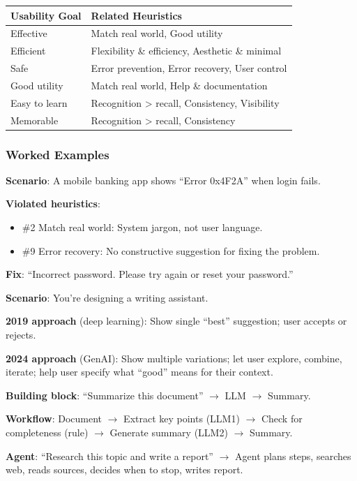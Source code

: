 \begin{center}
\renewcommand{\arraystretch}{1.2}
\begin{tabular}{@{} l l @{}}
\toprule
\textbf{Usability Goal} & \textbf{Related Heuristics} \\
\midrule
Effective & Match real world, Good utility \\
Efficient & Flexibility \& efficiency, Aesthetic \& minimal \\
Safe & Error prevention, Error recovery, User control \\
Good utility & Match real world, Help \& documentation \\
Easy to learn & Recognition > recall, Consistency, Visibility \\
Memorable & Recognition > recall, Consistency \\
\bottomrule
\end{tabular}
\end{center}

\subsubsection*{Worked Examples}

\begin{exbox}
\textbf{Scenario}: A mobile banking app shows ``Error 0x4F2A'' when login fails.

\textbf{Violated heuristics}:
\begin{itemize}
  \item \#2 Match real world: System jargon, not user language.
  \item \#9 Error recovery: No constructive suggestion for fixing the problem.
\end{itemize}

\textbf{Fix}: ``Incorrect password. Please try again or reset your password.''
\end{exbox}

\begin{exbox}
\textbf{Scenario}: You're designing a writing assistant.

\textbf{2019 approach} (deep learning): Show single ``best'' suggestion; user accepts or rejects.

\textbf{2024 approach} (GenAI): Show multiple variations; let user explore, combine, iterate; help user specify what ``good'' means for their context.
\end{exbox}

\begin{exbox}
\textbf{Building block}: ``Summarize this document'' $\to$ LLM $\to$ Summary.

\textbf{Workflow}: Document $\to$ Extract key points (LLM1) $\to$ Check for completeness (rule) $\to$ Generate summary (LLM2) $\to$ Summary.

\textbf{Agent}: ``Research this topic and write a report'' $\to$ Agent plans steps, searches web, reads sources, decides when to stop, writes report.
\end{exbox}

